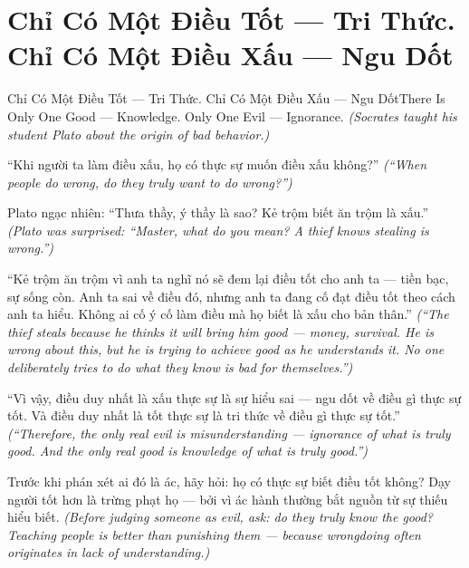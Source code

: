\section{Chỉ Có Một Điều Tốt — Tri Thức. Chỉ Có Một Điều Xấu — Ngu Dốt}
\begin{truyen}{Chỉ Có Một Điều Tốt — Tri Thức. Chỉ Có Một Điều Xấu — Ngu Dốt}{There Is Only One Good — Knowledge. Only One Evil — Ignorance.}
\textit{(Socrates taught his student Plato about the origin of bad behavior.)}

``Khi người ta làm điều xấu, họ có thực sự muốn điều xấu không?''
\textit{(``When people do wrong, do they truly want to do wrong?'')}

Plato ngạc nhiên: ``Thưa thầy, ý thầy là sao? Kẻ trộm biết ăn trộm là xấu.''
\textit{(Plato was surprised: ``Master, what do you mean? A thief knows stealing is wrong.'')}

``Kẻ trộm ăn trộm vì anh ta nghĩ nó sẽ đem lại điều tốt cho anh ta — tiền bạc, sự sống còn. Anh ta sai về điều đó, nhưng anh ta đang cố đạt điều tốt theo cách anh ta hiểu. Không ai cố ý cố làm điều mà họ biết là xấu cho bản thân.''
\textit{(``The thief steals because he thinks it will bring him good — money, survival. He is wrong about this, but he is trying to achieve good as he understands it. No one deliberately tries to do what they know is bad for themselves.'')}

``Vì vậy, điều duy nhất là xấu thực sự là sự hiểu sai — ngu dốt về điều gì thực sự tốt. Và điều duy nhất là tốt thực sự là tri thức về điều gì thực sự tốt.''
\textit{(``Therefore, the only real evil is misunderstanding — ignorance of what is truly good. And the only real good is knowledge of what is truly good.'')}

\end{truyen}

\begin{baihoc}
Trước khi phán xét ai đó là ác, hãy hỏi: họ có thực sự biết điều tốt không? Dạy người tốt hơn là trừng phạt họ — bởi vì ác hành thường bắt nguồn từ sự thiếu hiểu biết.
\textit{(Before judging someone as evil, ask: do they truly know the good? Teaching people is better than punishing them — because wrongdoing often originates in lack of understanding.)}
\end{baihoc}
\ngancach

